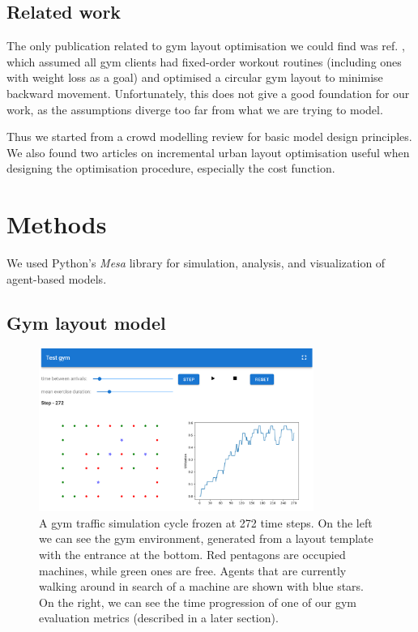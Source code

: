 \documentclass[9pt]{pnas-new}
\begin{document}
\subsection*{Related work}
The only publication related to gym layout optimisation we could find was ref. \cite{turcine2022gym}, which assumed all gym clients had fixed-order workout routines (including ones with weight loss as a goal) and optimised a circular gym layout to minimise backward movement. Unfortunately, this does not give a good foundation for our work, as the assumptions diverge too far from what we are trying to model.

Thus we started from a crowd modelling review \cite{yang2020crowd_modelling_review} for basic model design principles. We also found two articles on incremental urban layout optimisation \cite{feng2016crowd_drive_layout_design, mathew2019urban_walkability} useful when designing the optimisation procedure, especially the cost function.

\section*{Methods}

We used Python's {\it Mesa} library for simulation, analysis, and visualization of agent-based models.

\subsection*{Gym layout model}

\begin{figure}[h]
	\centering
	\includegraphics[width=0.8\textwidth]{frozen_simulation_tpl.png}
	\caption{A gym traffic simulation cycle frozen at 272 time steps. On the left we can see the gym environment, generated from a layout template with the entrance at the bottom. Red pentagons are occupied machines, while green ones are free. Agents that are currently walking around in search of a machine are shown with blue stars. On the right, we can see the time progression of one of our gym evaluation metrics (described in a later section).}
    \label{fig:simulation_interface}
\end{figure}
\end{document}
